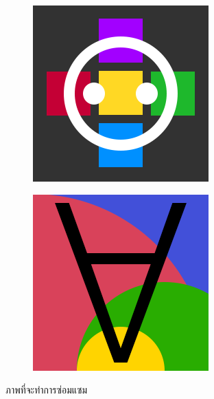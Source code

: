 \begin{figure}[H]
\begin{subfigure}{\ResultSubFigureWidth \linewidth}
    \end{subfigure}
    \begin{subfigure}{\ResultSubFigureWidth \linewidth}
        \centering
        \includegraphics[width=\ResultSubFigurePadding \linewidth]{image/image_inpaint_synthetic/case04-toinpaint.png}		
    \end{subfigure}
    \begin{subfigure}{\ResultSubFigureWidth \linewidth}
        \centering
        \includegraphics[width=\ResultSubFigurePadding \linewidth]{image/image_inpaint_synthetic/case05-toinpaint.png}		
    \end{subfigure}
    \caption{ภาพที่จะทำการซ่อมแซม}
    \label{figure:synart_toinpaint}
\end{figure}